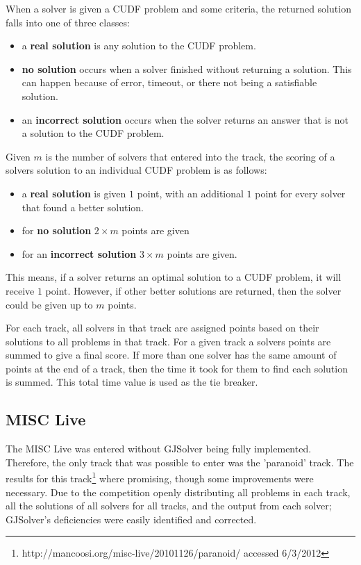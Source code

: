 When a solver is given a CUDF problem and some criteria, the returned solution falls into one of three classes:
\begin{itemize}
  \item a \textbf{real solution} is any solution to the CUDF problem.
  \item \textbf{no solution} occurs when a solver finished without returning a solution. This can happen because of error, timeout, or there not being a satisfiable solution.
  \item an \textbf{incorrect solution} occurs when the solver returns an answer that is not a solution to the CUDF problem.
\end{itemize}

Given $m$ is the number of solvers that entered into the track, the scoring of a solvers solution to an individual CUDF problem is as follows:
\begin{itemize}
  \item a \textbf{real solution} is given $1$ point, with an additional $1$ point for every solver that found a better solution.
  \item for \textbf{no solution} $2\times m$ points are given
  \item for an \textbf{incorrect solution} $3 \times m$ points are given.
\end{itemize}
This means, if a solver returns an optimal solution to a CUDF problem, it will receive $1$ point.
However, if other better solutions are returned, then the solver could be given up to $m$ points.

For each track, all solvers in that track are assigned points based on their solutions to all problems in that track.
For a given track a solvers points are summed to give a final score.
If more than one solver has the same amount of points at the end of a track, then the time it took for them to find each solution is summed.
This total time value is used as the tie breaker.

\subsection{MISC Live}
The MISC Live was entered without GJSolver being fully implemented.
Therefore, the only track that was possible to enter was the 'paranoid' track.
The results for this track\footnote{http://mancoosi.org/misc-live/20101126/paranoid/ accessed 6/3/2012} where promising, though some improvements were necessary.
Due to the competition openly distributing all problems in each track, all the solutions of all solvers for all tracks, 
and the output from each solver;
GJSolver's deficiencies were easily identified and corrected.

